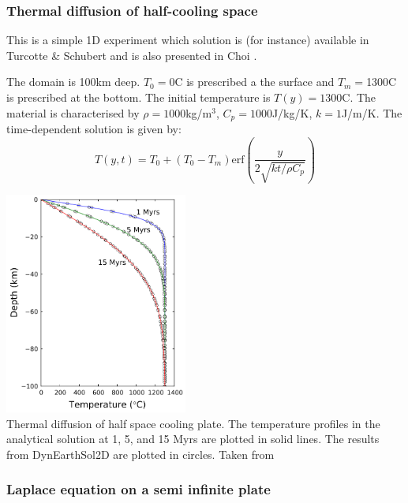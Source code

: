 \subsubsection{Thermal diffusion of half-cooling space} \label{sec:hcsp}

This is a simple 1D experiment which solution is (for instance) available 
in Turcotte \& Schubert \cite{tusc} and is also presented in Choi \etal \cite{chtl13}.

The domain is 100km deep. $T_0=$0\degree C is prescribed a the surface and 
$T_m=$1300\degree C is prescribed at the bottom. The initial temperature is $T(y)=1300$\degree C.
The material is characterised by $\rho=1000$kg/m$^3$, $C_p=1000$J/kg/K, 
$k=1$J/m/K. The time-dependent solution is given by:
\begin{equation}
T(y,t)=T_0 + (T_0-T_m) \text{erf} \left( \frac{y}{2\sqrt{k t /\rho C_p}}  \right)
\end{equation}

\begin{center}
\includegraphics[width=6cm]{images/benchmark_hcsp/chtl13}\\
{\captionfont Thermal diffusion of half space cooling plate.
The temperature profiles in the analytical solution at 1, 5,
and 15 Myrs are plotted in solid lines. The results from
DynEarthSol2D are plotted in circles. Taken from \cite{chtl13}}
\end{center}


\subsubsection{Laplace equation on a semi infinite plate} \label{sec:lapplate}


